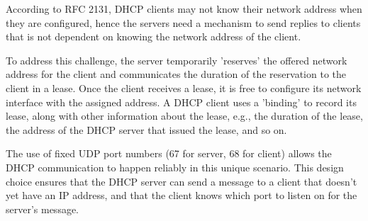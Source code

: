 According to RFC 2131, DHCP clients may not know their network address when they are configured, hence the servers need a mechanism to send replies to clients that is not dependent on knowing the network address of the client. 

To address this challenge, the server temporarily 'reserves' the offered network address for the client and communicates the duration of the reservation to the client in a lease. Once the client receives a lease, it is free to configure its network interface with the assigned address. A DHCP client uses a 'binding' to record its lease, along with other information about the lease, e.g., the duration of the lease, the address of the DHCP server that issued the lease, and so on.

The use of fixed UDP port numbers (67 for server, 68 for client) allows the DHCP communication to happen reliably in this unique scenario. This design choice ensures that the DHCP server can send a message to a client that doesn't yet have an IP address, and that the client knows which port to listen on for the server's message.
